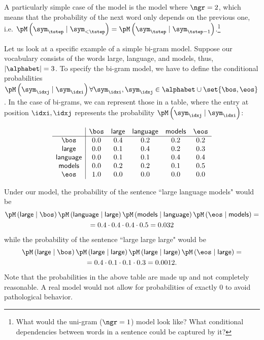 A particularly simple case of the \ngram{} model is the  model where $\ngr = 2$, which means that the probability of the next word only depends on the previous one, i.e. $\pM \left( \sym_{\tstep} \mid \sym_{<\tstep} \right) = \pM \left( \sym_{\tstep} \mid \sym_{\tstep - 1} \right)$.\footnote{What would the uni-gram ($\ngr = 1$) model look like? What conditional dependencies between words in a sentence could be captured by it?}

\begin{example}
Let us look at a specific example of a simple bi-gram model. 
Suppose our vocabulary consists of the words \textsf{large}, \textsf{language}, and \textsf{models}, thus, $|\alphabet|=3$. 
To specify the bi-gram model, we have to define the conditional probabilities $\pM \left( \sym_{\idxj} \mid \sym_{\idxi} \right) \forall \sym_{\idxi}, \sym_{\idxj} \in \alphabet \cup \set{\bos, \eos}$. 
In the case of bi-grams, we can represent those in a table, where the entry at position $\idxi,\idxj$ represents the probability $\pM \left( \sym_{\idxj} \mid \sym_{\idxi} \right)$:

{
    \centering
    \[\begin{array}{c|ccccc}
     & \text{$\bos$} & \textsf{large} & \textsf{language} & \textsf{models} & \textsf{$\eos$}\\
    \hline
    \text{$\bos$} & 0.0 & 0.4 & 0.2 & 0.2 & 0.2 \\
    \textsf{large} & 0.0 & 0.1 & 0.4 & 0.2 & 0.3 \\
    \textsf{language} & 0.0 & 0.1 & 0.1 & 0.4 & 0.4 \\
    \textsf{models} & 0.0 & 0.2 & 0.2 & 0.1 & 0.5 \\
    \textsf{$\eos$} & 1.0 & 0.0 & 0.0 & 0.0 & 0.0\\
    \end{array}\]
}

Under our model, the probability of the sentence ``large language models" would be 
\begin{gather*}
    \pM \left( \textsf{large} \mid \bos \right) \pM \left( \textsf{language} \mid \textsf{large} \right) \pM \left( \textsf{models} \mid \textsf{language} \right) \pM \left( \eos \mid \textsf{models} \right) = \\ = 0.4 \cdot 0.4 \cdot 0.4 \cdot 0.5 = 0.032
\end{gather*} 
while the probability of the sentence ``large large large" would be 
\begin{gather*}
    \pM \left( \textsf{large} \mid \bos \right) \pM \left( \textsf{large} \mid \textsf{large} \right) \pM \left( \textsf{large} \mid \textsf{large} \right) \pM \left( \eos \mid \textsf{large} \right) = \\ = 0.4 \cdot 0.1 \cdot 0.1 \cdot 0.3 = 0.0012.
\end{gather*}
Note that the probabilities in the above table are made up and not completely reasonable. 
A real \ngram{} model would not allow for probabilities of exactly $0$ to avoid pathological behavior. 
\end{example}

